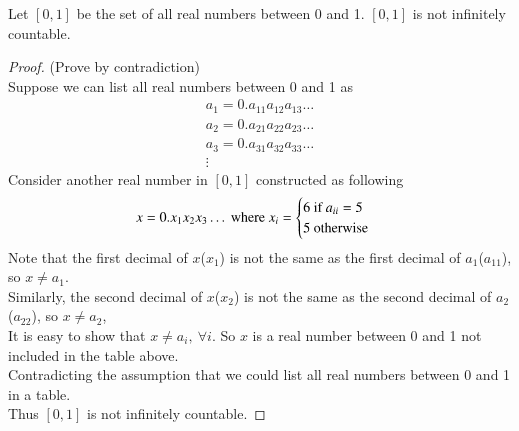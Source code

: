 \documentclass[11pt]{article}
\begin{document}
		\begin{theorem}
			Let $[0,1]$ be the set of all real numbers between 0 and 1. $[0,1]$ is not infinitely countable.
		\end{theorem}
		\begin{proof}
			(Prove by contradiction) \\
			Suppose we can list all real numbers between 0 and 1 as 
			\begin{gather*}
				a_1 = 0.a_{11}a_{12}a_{13}\dots \\
				a_2 = 0.a_{21}a_{22}a_{23}\dots \\
				a_3 = 0.a_{31}a_{32}a_{33}\dots \\
				\vdots
			\end{gather*}
			Consider another real number in $[0,1]$ constructed as following
			\[
				x = 0.x_1 x_2 x_3 \dots \text{{ where }} x_i = \begin{cases}
					6 \text{{ if }} a_{ii} = 5 \\
					5 \text{{ otherwise}}
				\end{cases}
			\]
			Note that the first decimal of $x$($x_1$) is not the same as the first decimal of $a_1$($a_{11}$), so $x \neq a_1$. \\
			Similarly, the second decimal of $x$($x_2$) is not the same as the second decimal of $a_2$($a_{22}$), so $x \neq a_2$, \\
			It is easy to show that $x \neq a_i,\ \forall i$. So $x$ is a real number between 0 and 1 not included in the table above. \\
			Contradicting the assumption that we could list all real numbers between 0 and 1 in a table. \\
			Thus $[0,1]$ is not infinitely countable.
		\end{proof}
\end{document}
